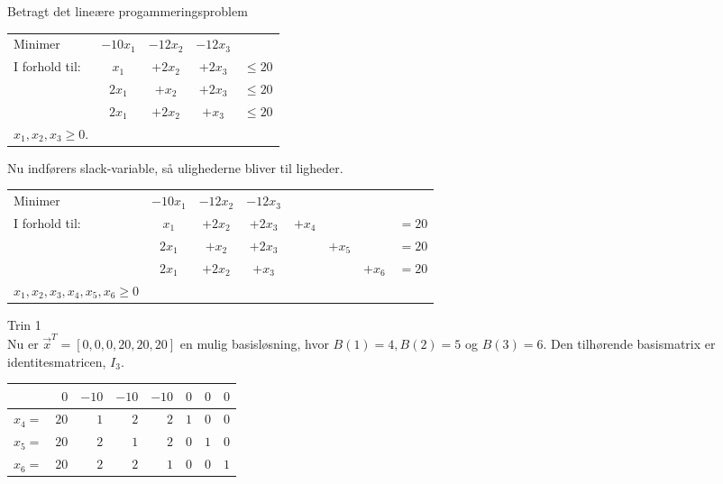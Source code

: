 \begin{eks}
Betragt det lineære progammeringsproblem
\begin{center}
\begin{tabular}{ l c c  c  r }
Minimer &$-10x_1$&$-12x_2$ & $-12x_3$&\\
I forhold til: &$x_1$&+$2x_2 $&+$2x_3$ & $\leq 20$\\
&$2x_1$& $+x_2$& $+2x_3$ & $\leq 20$\\
&$2x_1$&$+2x_2$&$+x_3$&$\leq 20$\\
$x_1,x_2,x_3\geq 0$.
\end{tabular}
\end{center}

Nu indførers slack-variable, så ulighederne bliver til ligheder. 
\begin{center}
\begin{tabular}{ l c c  c c c c r }
Minimer &$-10x_1$&$-12x_2$ & $-12x_3$&&&\\
I forhold til: &$x_1$&+$2x_2 $&+$2x_3$ &$+x_4$&& &$=20$\\
&$2x_1$& $+x_2$& $+2x_3$ & & $+x_5$ &&$=20$\\
&$2x_1$&$+2x_2$&$+x_3$&&&$+x_6$&$=20$\\
$x_1,x_2,x_3,x_4,x_5,x_6\geq 0$
\end{tabular}
\end{center}

Trin 1\\
Nu er $\vec{x}^T=[0,0,0,20,20,20]$ en mulig basisløsning, hvor $B(1)=4,B(2)=5$ og $B(3)=6$. Den tilhørende basismatrix er identitesmatricen, $I_3$. 
\begin{center}
\begin{tabular}{|r| r|r r r r r r|}
  \hline	
  &$0$&$-10$ &$-10$&$-10$&$0$&$0$&$0$\\ \hline	
  $x_4=$&$20$&$1$&$2$&$2$&$1$&$0$&$0$\\	
  $x_5=$&$20$&$2$&$1$&$2$&$0$&$1$&$0$\\
  $x_6=$&$20$&$2$&$2$&$1$&$0$&$0$&$1$\\
   \hline
\end{tabular}
\end{center}


\end{eks}
